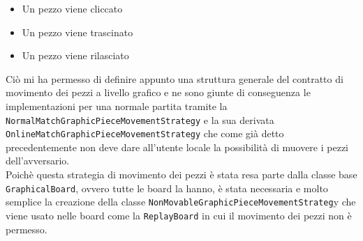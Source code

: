 \documentclass[a4paper,12pt]{report}
\begin{document}
\begin{itemize}
    \item Un pezzo viene cliccato
    \item Un pezzo viene trascinato
    \item Un pezzo viene rilasciato
\end{itemize}
Ciò mi ha permesso di definire appunto una struttura generale del contratto di movimento dei pezzi a livello grafico e ne sono giunte di conseguenza le implementazioni per una normale partita tramite la \texttt{NormalMatchGraphicPieceMovementStrategy} e la sua derivata \texttt{OnlineMatchGraphicPieceMovementStrategy} che come già detto precedentemente non deve dare all'utente locale la possibilità di muovere i pezzi dell'avversario.
\\
Poichè questa strategia di movimento dei pezzi è stata resa parte dalla classe base
\texttt{GraphicalBoard}, ovvero tutte le board la hanno, è stata necessaria e molto semplice la creazione della classe \texttt{NonMovableGraphicPieceMovementStrateg}y che viene usato nelle board come la \texttt{ReplayBoard} in cui il movimento dei pezzi non è permesso.
\end{document}

